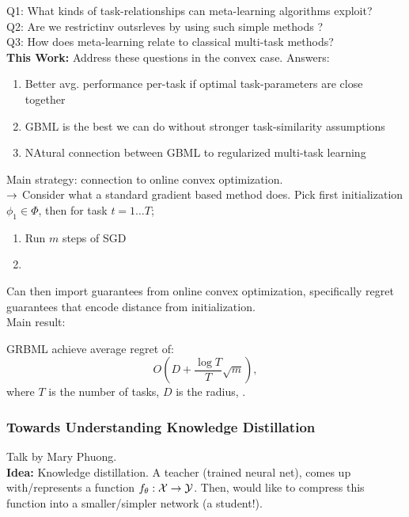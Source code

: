 Q1: What kinds of task-relationships can meta-learning algorithms exploit?  \\

Q2: Are we restrictinv outsrleves by using such simple methods ? \\

Q3: How does meta-learning relate to classical multi-task methods? \\

{\bf This Work:} Address these questions in the convex case. Answers:

\begin{enumerate}
    \item Better avg. performance per-task if optimal task-parameters are close together
    \item GBML is the best we can do without stronger task-similarity assumptions
    \item NAtural connection between GBML to regularized multi-task learning
\end{enumerate}

Main strategy: connection to online convex optimization.\\
$\rightarrow$ Consider what a standard gradient based method does. Pick first initialization $\phi_1 \in \Phi$, then for task $t = 1 \ldots T$;
\begin{enumerate}
    \item Run $m$ steps of SGD
    \item {}
\end{enumerate}
Can then import guarantees from online convex optimization, specifically regret guarantees that encode distance from initialization. \\

Main result:
\begin{theorem}
GRBML achieve average regret of:
\[
O\left(D + \frac{\log T}{T} \sqrt{m}\right),
\]
where $T$ is the number of tasks, $D$ is the radius, .
\end{theorem}

\spacerule

\subsubsection{Towards Understanding Knowledge Distillation~\cite{phuong2019towards}}

Talk by Mary Phuong. \\

{\bf Idea:} Knowledge distillation. A teacher (trained neural net), comes up with/represents a function $f_\theta : \mathcal{X} \rightarrow \mathcal{Y}$. Then, would like to compress this function into a smaller/simpler network (a student!). \\

